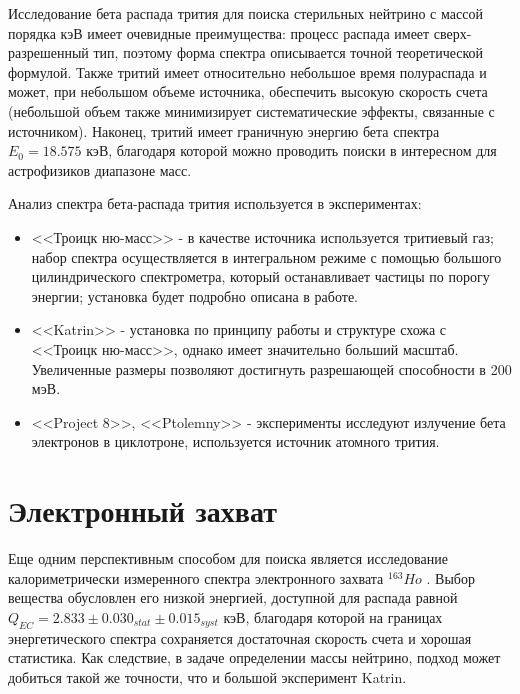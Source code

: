 \documentclass[a4paper,14pt]{extreport}
\begin{document}
Исследование бета распада трития для поиска стерильных нейтрино с массой порядка кэВ имеет очевидные преимущества: процесс распада имеет сверх-разрешенный тип, поэтому форма спектра описывается точной теоретической формулой. Также тритий имеет относительно небольшое время полураспада и может, при небольшом объеме источника, обеспечить высокую скорость счета (небольшой объем также минимизирует систематические эффекты, связанные с источником). Наконец, тритий имеет граничную энергию бета спектра $ E_0 = 18.575 $ кэВ, благодаря которой можно проводить поиски в интересном для астрофизиков диапазоне масс.

Анализ спектра бета-распада трития используется в экспериментах:
\begin{itemize}
	\item <<Троицк ню-масс>> - в качестве источника используется тритиевый газ; набор спектра осуществляется в интегральном режиме с помощью большого цилиндрического спектрометра, который останавливает частицы по порогу энергии;  установка будет подробно описана в работе.
	\item <<Katrin>>\cite{katrin-design-report-2004}\cite{current-direct-neutrino-mass-experiments} - установка по принципу работы и структуре схожа с <<Троицк ню-масс>>, однако имеет значительно больший масштаб. Увеличенные размеры позволяют достигнуть разрешающей способности в 200 мэВ.
	\item <<Project 8>>\cite{rel-cyclotron-tritium}\cite{single-electron-detection-and-spectroscopy-via-relativistic-cyclotron-radiation}, <<Ptolemny>>\cite{ptolemy} - эксперименты исследуют излучение бета электронов в циклотроне, используется источник атомного трития.
\end{itemize}

\section{Электронный захват}

Еще одним перспективным способом для поиска является исследование калориметрически измеренного спектра электронного захвата  $ ^{163}Ho $ . Выбор вещества обусловлен его низкой энергией, доступной для распада равной $Q_{E C} = 2.833 \pm 0.030_{stat} \pm 0.015_{syst} $ кэВ\cite{1604.04210}\cite{0911.3329}, благодаря которой на границах энергетического спектра сохраняется достаточная скорость счета и хорошая статистика. Как следствие, в задаче определении массы нейтрино, подход может добиться такой же точности, что и большой эксперимент Katrin.
\end{document}
